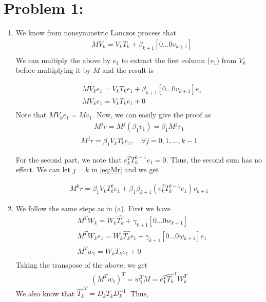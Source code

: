 \section*{Problem 1:}
\begin{enumerate}
\item
We know from nonsymmetric Lanczos process that 
\begin{align*}
&MV_{k} = V_{k}T_{k} + \beta_{k+1}[0 \dots 0 v_{k+1}] \\
\end{align*}
We can multiply the above by $e_{1}$ to extract the first column ($v_{1}$) from $V_{k}$ before multiplying it by $M$ and the result is 

\begin{align*}
&MV_{k}e_{1} = V_{k}T_{k}e_{1} + \beta_{k+1}[0 \dots 0 v_{k+1}]e_{1} \\
& MV_{k}e_{1} = V_{k}T_{k}e_{1} + 0\\
\end{align*}
Note that $MV_{k}e_{1} = Mv_{1}$.  Now, we can easily give the proof as 
\begin{align*}
M^{j}r = M^{j}(\beta_{1}v_{1}) = \beta_{1}M^{j}v_{1}
\end{align*}
\begin{align}
M^{j}r = \beta_{1}V_{k}T_{k}^{j}e_{1}, \quad \forall j=0,1,\dots, k-1
\label{eq:Mr}
\end{align}

For the second part, we note that $e_{k}^{T}T_{k}^{k-1}e_{1} = 0$. Thus, the second sum has no effect. We can let $j = k$ in \ref{eq:Mr} and we get 

\begin{align*}
M^{k}r = \beta_{1}V_{k}T_{k}^{k}e_{1} + \beta_{1}\beta_{k+1}(e_{k}^{T}T_{k}^{k-1}e_{1})v_{k+1}
\end{align*}

\item We follow the same steps as in (a). First we have 
\begin{align*}
& M^{T}W_{k} = W_{k}\hat{T_{k}} + \gamma_{k+1}[0 \dots 0 w_{k+1}]\\
& M^{T}W_{k}e_{1} = W_{k}\hat{T_{k}}e_{1} + \gamma_{k+1}[0 \dots 0 w_{k+1}]e_{1}\\
& M^{T}w_{1} = W_{k}\hat{T_{k}}e_{1} + 0\\
\end{align*}
Taking the transpose of the above, we get 
\begin{align*}
(M^{T}w_{1})^{T} = w_{1}^{T}M = e_{1}^{T}\hat{T_{k}}^{T}W_{k}^{T}
\end{align*}
We also know that $\hat{T_{k}}^{T} = D_{k}T_{k}D^{-1}_{k}$. Thus, 


\end{enumerate}
